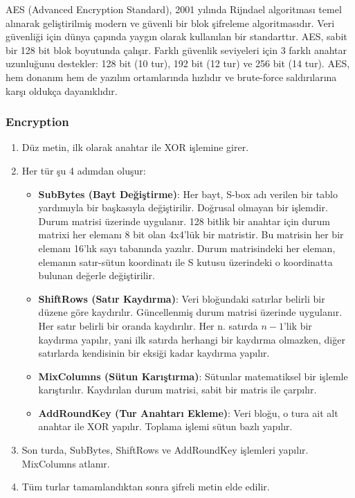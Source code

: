 AES (Advanced Encryption Standard), 2001 yılında Rijndael algoritması temel alınarak geliştirilmiş modern ve güvenli bir blok şifreleme algoritmasıdır. Veri güvenliği için dünya çapında yaygın olarak kullanılan bir standarttır. AES, sabit bir 128 bit blok boyutunda çalışır. Farklı güvenlik seviyeleri için 3 farklı anahtar uzunluğunu destekler: 128 bit (10 tur), 192 bit (12 tur) ve 256 bit (14 tur). AES, hem donanım hem de yazılım ortamlarında hızlıdır ve brute-force saldırılarına karşı oldukça dayanıklıdır.

\subsubsection{Encryption}

\begin{enumerate}
    \item Düz metin, ilk olarak anahtar ile XOR işlemine girer.
    \item Her tür şu 4 adımdan oluşur:
    \begin{itemize}
        \item \textbf{SubBytes (Bayt Değiştirme)}: Her bayt, S-box adı verilen bir tablo yardımıyla bir başkasıyla değiştirilir. Doğrusal olmayan bir işlemdir. Durum matrisi üzerinde uygulanır. 128 bitlik bir anahtar için durum matrixi her elemanı 8 bit olan 4x4'lük bir matristir. Bu matrisin her bir elemanı 16'lık sayı tabanında yazılır. Durum matrisindeki her eleman, elemanın satır-sütun koordinatı ile S kutusu üzerindeki o koordinatta bulunan değerle değiştirilir.
        \item \textbf{ShiftRows (Satır Kaydırma)}: Veri bloğundaki satırlar belirli bir düzene göre kaydırılır. Güncellenmiş durum matrisi üzerinde uygulanır. Her satır belirli bir oranda kaydırılır. Her n. satırda $n - 1$'lik bir kaydırma yapılır, yani ilk satırda herhangi bir kaydırma olmazken, diğer satırlarda kendisinin bir eksiği kadar kaydırma yapılır.
        \item \textbf{MixColumns (Sütun Karıştırma)}: Sütunlar matematiksel bir işlemle karıştırılır. Kaydırılan durum matrisi, sabit bir matris ile çarpılır.
        \item \textbf{AddRoundKey (Tur Anahtarı Ekleme)}: Veri bloğu, o tura ait alt anahtar ile XOR yapılır. Toplama işlemi sütun bazlı yapılır.
    \end{itemize}
    \item Son turda, SubBytes, ShiftRows ve AddRoundKey işlemleri yapılır. MixColumns atlanır.
    \item Tüm turlar tamamlandıktan sonra şifreli metin elde edilir.
\end{enumerate}

